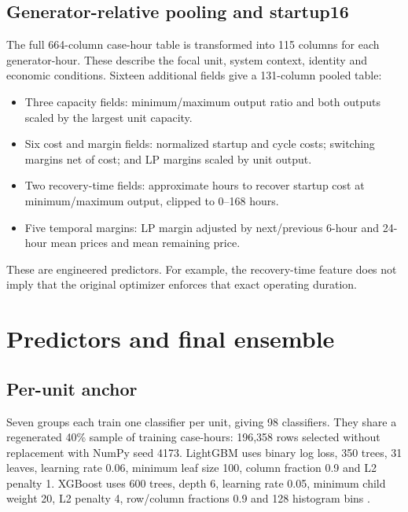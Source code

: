 \documentclass[a4paper,11pt]{article}
\begin{document}
\subsection*{Generator-relative pooling and startup16}
The full 664-column case-hour table is transformed into 115 columns for each generator-hour. These describe the focal unit, system context, identity and economic conditions. Sixteen additional fields give a 131-column pooled table:
\begin{itemize}
\item Three capacity fields: minimum/maximum output ratio and both outputs scaled by the largest unit capacity.
\item Six cost and margin fields: normalized startup and cycle costs; switching margins net of cost; and LP margins scaled by unit output.
\item Two recovery-time fields: approximate hours to recover startup cost at minimum/maximum output, clipped to 0--168 hours.
\item Five temporal margins: LP margin adjusted by next/previous 6-hour and 24-hour mean prices and mean remaining price.
\end{itemize}
These are engineered predictors. For example, the recovery-time feature does not imply that the original optimizer enforces that exact operating duration.

\section{Predictors and final ensemble}
\subsection*{Per-unit anchor}
Seven groups each train one classifier per unit, giving 98 classifiers. They share a regenerated 40\% sample of training case-hours: 196,358 rows selected without replacement with NumPy seed 4173. LightGBM uses binary log loss, 350 trees, 31 leaves, learning rate 0.06, minimum leaf size 100, column fraction 0.9 and L2 penalty 1. XGBoost uses 600 trees, depth 6, learning rate 0.05, minimum child weight 20, L2 penalty 4, row/column fractions 0.9 and 128 histogram bins \cite{manifests}.
\end{document}
